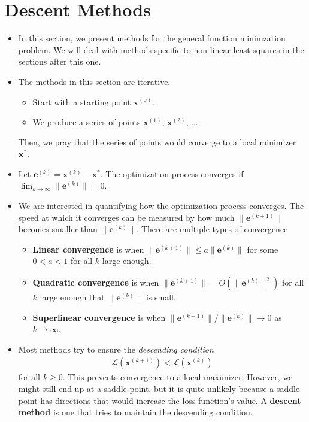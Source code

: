 \documentclass[10pt]{article}
\newcommand{\ve}[1]{\mathbf{#1}}
\newcommand{\ra}{\rightarrow}
\newcommand{\mcal}[1]{\mathcal{#1}}
\begin{document}
\section{Descent Methods}

\begin{itemize}
    \item In this section, we present methods for the general function minimzation problem. We will deal with methods specific to non-linear least squares in the sections after this one.
    
    \item The methods in this section are iterative.
    \begin{itemize}
        \item Start with a starting point $\ve{x}^{(0)}$.
        \item We produce a series of points $\ve{x}^{(1)}$, $\ve{x}^{(2)}$, $\dotsc$.
    \end{itemize}
    Then, we pray that the series of points would converge to a local minimizer $\ve{x}^*$.

    \item Let $\ve{e}^{(k)} = \ve{x}^{(k)} - \ve{x}^*.$ The optimization process converges if $\lim_{k \ra \infty} \| \ve{e}^{(k)}\| = 0$.
    
    \item We are interested in quantifying how the optimization process converges. The speed at which it converges can be measured by how much $\| \ve{e}^{(k+1)} \|$ becomes smaller than $\| \ve{e}^{(k)} \|$. There are multiple types of convergence
    \begin{itemize}
        \item {\bf Linear convergence} is when $\| \ve{e}^{(k+1)}\| \leq a\| \ve{e}^{(k)} \|$ for some $0 < a < 1$ for all $k$ large enough.
        \item {\bf Quadratic convergence} is when $\| \ve{e}^{(k+1)}\| = O(\| \ve{e}^{(k)} \|^2)$ for all $k$ large enough that $\| \ve{e}^{(k)} \|$ is small.
        \item {\bf Superlinear convergence} is when $\| \ve{e}^{(k+1)}\| / \| \ve{e}^{(k)}\| \ra 0$ as $k \ra \infty$.
    \end{itemize}

    \item Most methods try to ensure the \emph{descending condition}
    \begin{align*}
        \mcal{L}(\ve{x}^{(k+1)}) < \mcal{L}(\ve{x}^{(k)})
    \end{align*}
    for all $k \geq 0$. This prevents convergence to a local maximizer. However, we might still end up at a saddle point, but it is quite unlikely because a saddle point has directions that would increase the loss function's value. A {\bf descent method} is one that tries to maintain the descending condition.


\end{itemize}
\end{document}
